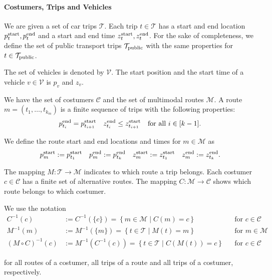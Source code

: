 \paragraph{Costumers, Trips and Vehicles} \parfill

We are given a set of car trips $\mathcal{T}$. Each trip $t\in\mathcal{T}$ has a start and end location $p^{\operatorname{start}}_t, p^{\operatorname{end}}_t$ and a start and end time $z^{\operatorname{start}}_t, z^{\operatorname{end}}_t$. For the sake of completeness, we define the set of public transport trips $\mathcal{T}_{\operatorname{public}}$ with the same properties for $t\in\mathcal{T}_{\operatorname{public}}$.

The set of vehicles is denoted by $\mathcal{V}$. The start position and the start time of a vehicle $v\in\mathcal{V}$ is $p_v$ and $z_v$.

We have the set of costumers $\mathcal{C}$ and the set of multimodal routes $\mathcal{M}$. A route $m=\left(t_1,\dots,t_{k_m}\right)$ is a finite sequence of trips with the following properties:
\begin{align*}
	p^{\operatorname{end}}_{t_i} = p^{\operatorname{start}}_{t_{i+1}} && z^{\operatorname{end}}_{t_i} \leq z^{\operatorname{start}}_{t_{i+1}} && \text{for all } i\in[k-1].
\end{align*}

We define the route start and end locations and times for $m\in\mathcal{M}$ as
\begin{align*}
	p^{\operatorname{start}}_m := p^{\operatorname{start}}_{t_1} & &  p^{\operatorname{end}}_m := p^{\operatorname{end}}_{t_k} & & z^{\operatorname{start}}_m := z^{\operatorname{start}}_{t_1} & & z^{\operatorname{end}}_m := z^{\operatorname{end}}_{t_k}.
\end{align*}

The mapping $M:\mathcal{T}\to\mathcal{M}$ indicates to which route a trip belongs. Each costumer $c\in\mathcal{C}$ has a finite set of alternative routes. The mapping $C:\mathcal{M}\to\mathcal{C}$ shows which route belongs to which costumer.

We use the notation
\begin{align*}
	C^{-1}(c) & := C^{-1}\left(\{c\}\right) = \left\{m\in\mathcal{M}\mid C(m)=c\right\} && \text{for } c\in\mathcal{C} \\
	M^{-1}(m) & := M^{-1}\left(\{m\}\right) = \left\{t\in\mathcal{T}\mid M(t)=m\right\} && \text{for } m\in\mathcal{M} \\
	\left(M\circ C\right)^{-1}(c) & := M^{-1}\left(C^{-1}(c)\right) = \left\{t\in\mathcal{T}\mid C\left(M(t)\right)=c\right\} && \text{for } c\in\mathcal{C}
\end{align*}

for all routes of a costumer, all trips of a route and all trips of a costumer, respectively.

